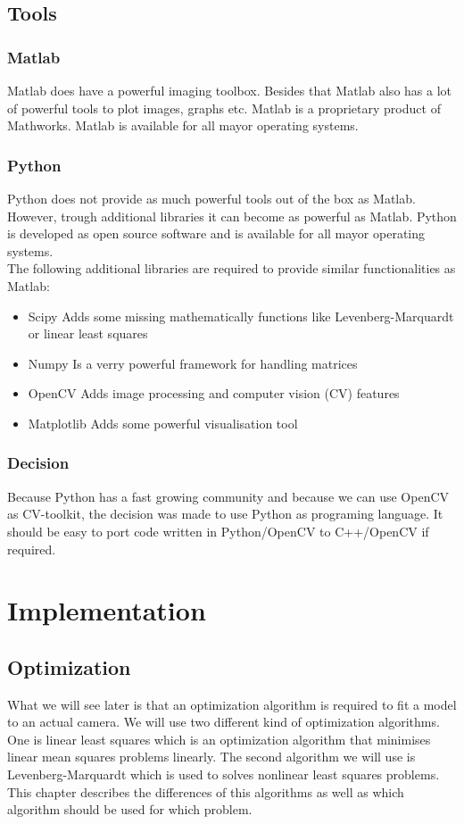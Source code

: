 \documentclass[11pt,a4paper,titlepage,oneside]{report}
\begin{document}
\section{Tools}
\subsection{Matlab}
Matlab does have a powerful imaging toolbox. Besides that Matlab also has a lot of powerful tools to plot images, graphs etc. Matlab is a proprietary product of Mathworks. Matlab is available for all mayor operating systems.

\subsection{Python}
Python does not provide as much powerful tools out of the box as Matlab. However, trough additional libraries it can become as powerful as Matlab. Python is developed as open source software and is available for all mayor operating systems.\\
The following additional libraries are required to provide similar functionalities as Matlab:
\begin{itemize}
  \item Scipy
    \subitem Adds some missing mathematically functions like Levenberg-Marquardt or linear least squares
  \item Numpy
    \subitem Is a verry powerful framework for handling matrices
  \item OpenCV
		\subitem Adds image processing and computer vision (CV) features
  \item Matplotlib
    \subitem Adds some powerful visualisation tool
\end{itemize}

\subsection{Decision}
Because Python has a fast growing community and because we can use OpenCV as CV-toolkit, the decision was made to use Python as programing language. It should be easy to port code written in Python/OpenCV to C++/OpenCV if required.

\chapter{Implementation}\label{chap:implementation}
\section{Optimization}
What we will see later is that an optimization algorithm is required to fit a model to an actual camera. We will use two different kind of optimization algorithms. One is linear least squares which is an optimization algorithm that minimises linear mean squares problems linearly. The second algorithm we will use is Levenberg-Marquardt which is used to solves nonlinear least squares problems. This chapter describes the differences of this algorithms as well as which algorithm should be used for which problem.
\end{document}
